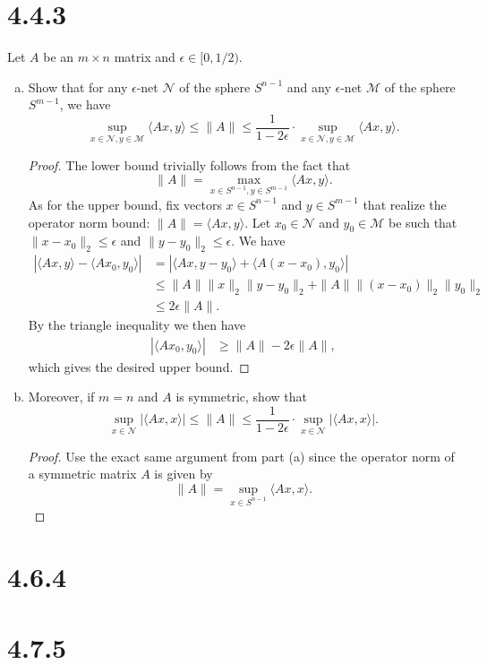 \documentclass[11pt,letterpaper]{report}
\newcommand{\mcal}[1]{\mathcal{#1}}
\begin{document}
\section*{4.4.3}
Let $A$ be an $m\times n$ matrix and $\epsilon\in [0, 1/2)$.
\begin{enumerate}[(a)]
	\item Show that for any $\epsilon$-net $\mcal{N}$ of the sphere $S^{n-1}$ and any $\epsilon$-net $\mcal{M}$ of the sphere $S^{m-1}$, we have
	\begin{equation}\label{epsnet1}
		\sup_{x\in \mcal{N}, y\in \mcal{M}}\langle Ax, y\rangle \leq \|A\|\leq \frac{1}{1-2\epsilon}\cdot \sup_{x\in \mcal{N}, y\in \mcal{M}}\langle Ax, y\rangle.
	\end{equation}

	\begin{proof}
		The lower bound trivially follows from the fact that
		\[
		\|A\| = \max_{x\in S^{n-1}, y\in S^{m-1}}\langle Ax, y\rangle.
		\]
		As for the upper bound, fix vectors $x\in S^{n-1}$ and $y\in S^{m-1}$ that realize the operator norm bound: $\|A\| = \langle Ax, y\rangle$. Let $x_0\in \mcal{N}$ and $y_0\in \mcal{M}$ be such that $\|x-x_0\|_2 \leq \epsilon$ and $\|y-y_0\|_2\leq \epsilon$. We have
		\begin{align*}
			|\langle Ax, y\rangle - \langle Ax_0, y_0\rangle| &= |\langle Ax, y-y_0\rangle + \langle A(x-x_0), y_0\rangle|\\
			&\leq \|A\|\|x\|_2\|y-y_0\|_2 + \|A\|\|(x-x_0)\|_2\|y_0\|_2\\
			&\leq 2\epsilon\|A\|.
		\end{align*}
		By the triangle inequality we then have
		\begin{align*}
			|\langle Ax_0, y_0\rangle| &\geq \|A\| - 2\epsilon\|A\|,
		\end{align*}
		which gives the desired upper bound.
	\end{proof}

	\item Moreover, if $m=n$ and $A$ is symmetric, show that
	\[
	\sup_{x\in \mcal{N}}|\langle Ax, x\rangle|\leq \|A\| \leq \frac{1}{1-2\epsilon}\cdot \sup_{x\in \mcal{N}}|\langle Ax, x\rangle|.
	\]
	\begin{proof}
		Use the exact same argument from part (a) since the operator norm of a symmetric matrix $A$ is given by
		\[
		\|A\| = \sup_{x\in S^{n-1}}\langle Ax, x\rangle.
		\]
	\end{proof}
\end{enumerate}










\section*{4.6.4}

\section*{4.7.5}
\end{document}
